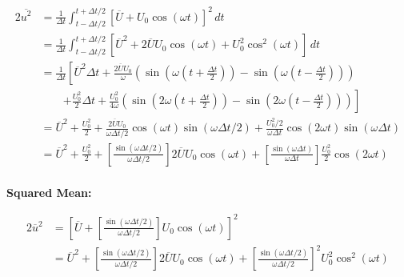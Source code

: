 \documentclass[a4paper]{article}
\begin{document}
\begin{alignat*}{2}
	\overline{u^{2}} & = \frac{1}{\Delta t} \int^{t + \Delta t / 2}_{t - \Delta t / 2} \!\left[ \overline{U} + U_{0} \cos\left( \omega t \right) \right]^{2} \, dt  \\
	& = \frac{1}{\Delta t} \int^{t + \Delta t / 2}_{t - \Delta t / 2} \!\left[ \overline{U}^{2} + 2 \overline{U} U_{0} \cos\left( \omega t \right) + U_{0}^{2} \cos^{2}\left( \omega t \right) \right]  \, dt  \\ 
	& = \frac{1}{\Delta t} \!\left[ \overline{U}^{2} \Delta t + \frac{2 \overline{U} U_{0}}{\omega} \!\left( \sin\left( \omega \!\left( t + \frac{\Delta t}{2} \right)  \right) - \sin\left( \omega \!\left( t - \frac{\Delta t}{2} \right)  \right) \right) \right. \\
	& \qquad \left. + \frac{U_{0}^{2}}{2} \Delta t + \frac{U_{0}^{2}}{4 \omega} \!\left( \sin\left( 2 \omega \!\left( t + \frac{\Delta t}{2} \right)  \right) - \sin\left( 2 \omega \!\left( t - \frac{\Delta t}{2} \right)  \right) \right)  \right] \\
	& = \overline{U}^{2} + \frac{U_{0}^{2}}{2} + \frac{2 \overline{U} U_{0}}{\omega \Delta t / 2} \cos\left( \omega t \right) \sin\left( \omega \Delta t / 2 \right) + \frac{U_{0}^{2} / 2}{\omega \Delta t} \cos\left( 2 \omega t \right) \sin\left( \omega \Delta t \right) \\
	& = \boxed{ \overline{U}^{2} + \frac{U_{0}^{2}}{2} + \!\left[ \frac{\sin\left( \omega \Delta t / 2 \right)}{\omega \Delta t / 2} \right] 2 \overline{U} U_{0} \cos\left( \omega t \right) + \!\left[ \frac{\sin\left( \omega \Delta t \right)}{\omega \Delta t} \right] \frac{U_{0}^{2}}{2} \cos\left( 2 \omega t \right) } \\
\end{alignat*}

\textbf{Squared Mean:}

\begin{alignat*}{2}
	\overline{u}^{2} & = \!\left[ \overline{U} + \!\left[ \frac{\sin\left( \omega \Delta t / 2 \right)}{\omega \Delta t / 2} \right] U_{0} \cos\left( \omega t \right) \right]^{2} \\
	 & = \boxed{ \overline{U}^{2} + \!\left[ \frac{\sin\left( \omega \Delta t / 2 \right)}{\omega \Delta t / 2} \right] 2 \overline{U} U_{0} \cos\left( \omega t \right) + \!\left[ \frac{\sin\left( \omega \Delta t / 2 \right)}{\omega \Delta t / 2} \right]^{2} U_{0}^{2} \cos^{2}\left( \omega t \right)} \\ 
\end{alignat*}
\end{document}

